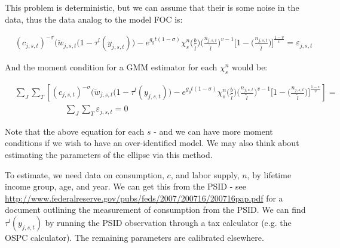 \documentclass[letterpaper,12pt]{article}
\theoremstyle{definition}
\begin{document}
        This problem is deterministic, but we can assume that their is some noise in the data, thus the data analog to the model FOC is: 

  \begin{equation}\label{EqEulerLabGen}
      \begin{split}
        &(c_{j,s,t})^{-\sigma}\Biggl(\tilde{w}_{j,s,t}(1-\tau^{l}(y_{j,s,t})\Biggr) - e^{g_y t(1-\sigma)}\chi^n_{s}\biggl(\frac{b}{\tilde{l}}\biggr)\biggl(\frac{n_{j,s,t}}{\tilde{l}}\biggr)^{v-1}\Biggl[1 - \biggl(\frac{n_{j,s,t}}{\tilde{l}}\biggr)\Biggr]^{\frac{1-v}{v}} = \varepsilon_{j,s,t}  
        \end{split}
        \end{equation}

And the moment condition for a GMM estimator for each $\chi^{n}_{s}$ would be:

  \begin{equation}\label{EqEulerLabGen}
      \begin{split}
        &\sum_{J}\sum_{T}\left[(c_{j,s,t})^{-\sigma}\Biggl(\tilde{w}_{j,s,t}(1-\tau^{l}(y_{j,s,t})\Biggr) - e^{g_y t(1-\sigma)}\chi^n_{s}\biggl(\frac{b}{\tilde{l}}\biggr)\biggl(\frac{n_{j,s,t}}{\tilde{l}}\biggr)^{v-1}\Biggl[1 - \biggl(\frac{n_{j,s,t}}{\tilde{l}}\biggr)\Biggr]^{\frac{1-v}{v}}\right] =\\
        &  \quad  \quad  \quad  \quad  \quad  \quad \sum_{J}\sum_{T}\varepsilon_{j,s,t}  = 0
        \end{split}
        \end{equation}
        
        Note that the above equation for each $s$ - and we can have more moment conditions if we wish to have an over-identified model.  We may also think about estimating the parameters of the ellipse via this method.
        
        To estimate, we need data on consumption, $c$, and labor supply, $n$, by lifetime income group, age, and year.  We can get this from the PSID - see \\
        \href{http://www.federalreserve.gov/pubs/feds/2007/200716/200716pap.pdf}{http://www.federalreserve.gov/pubs/feds/2007/200716/200716pap.pdf} for a document outlining the measurement of consumption from the PSID.  We can find $\tau^{l}(y_{j,s,t})$ by running the PSID observation through a tax calculator (e.g. the OSPC calculator).  The remaining parameters are calibrated elsewhere.
        
        
        
\end{document}
